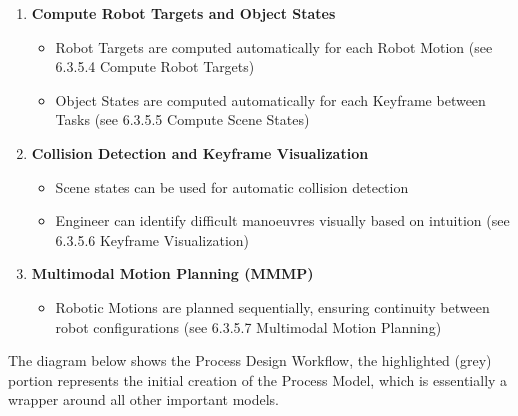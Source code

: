 \begin{enumerate}
\begin{itemize}
\end{itemize}
	\item \textbf{Compute Robot Targets and Object States}

\begin{itemize}
	\item Robot Targets are computed automatically for each Robot Motion (see 6.3.5.4 Compute Robot Targets)

	\item Object States are computed automatically for each Keyframe between Tasks (see 6.3.5.5 Compute Scene States)

\end{itemize}
	\item \textbf{Collision Detection and Keyframe Visualization}

\begin{itemize}
	\item Scene states can be used for automatic collision detection

	\item Engineer can identify difficult manoeuvres visually based on intuition (see 6.3.5.6 Keyframe Visualization)

\end{itemize}

    \item \textbf{Multimodal Motion Planning (MMMP)}

\begin{itemize}
	\item Robotic Motions are planned sequentially, ensuring continuity between robot configurations (see 6.3.5.7 Multimodal Motion Planning)

\end{itemize}
\end{enumerate}

The diagram below shows the Process Design Workflow, the highlighted (grey) portion represents the initial creation of the Process Model, which is essentially a wrapper around all other important models. 





